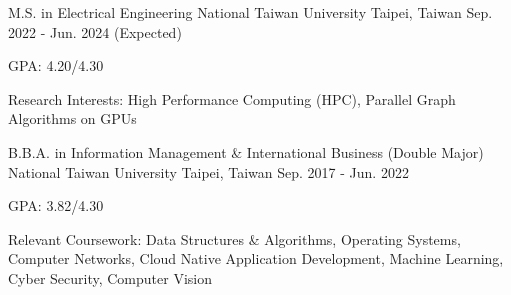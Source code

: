 

\begin{cventries}

  \cventry
    {M.S. in Electrical Engineering} %
    {National Taiwan University} %
    {Taipei, Taiwan} %
    {Sep. 2022 - Jun. 2024 (Expected)} %
    {
      \begin{cvitems} %
        \item {GPA: 4.20/4.30}
        \item {Research Interests: High Performance Computing (HPC), Parallel Graph Algorithms on GPUs}
      \end{cvitems}
    }

  \cventry
    {B.B.A. in Information Management \& International Business (Double Major)} %
    {National Taiwan University} %
    {Taipei, Taiwan} %
    {Sep. 2017 - Jun. 2022} %
    {
      \begin{cvitems}
        \item GPA: 3.82/4.30
        \item {Relevant Coursework: Data Structures \& Algorithms, Operating Systems, Computer Networks, Cloud Native Application Development, Machine Learning, Cyber Security, Computer Vision}
      \end{cvitems}
    }
\end{cventries}
